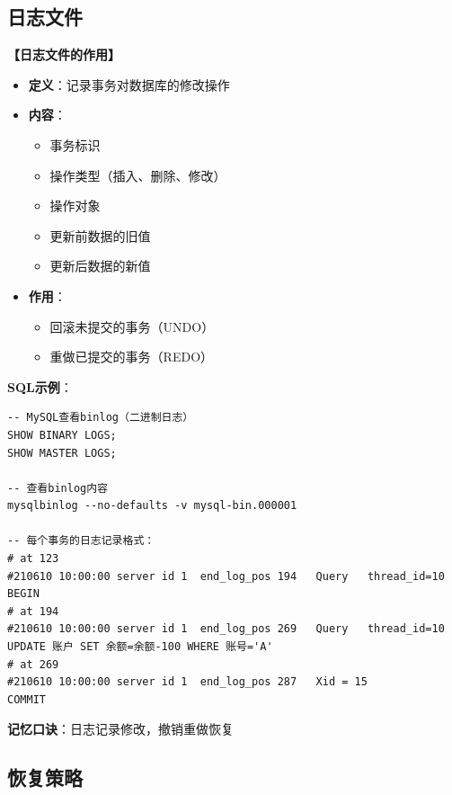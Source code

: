 \documentclass[12pt, a4paper]{article}
\newenvironment{bluebox}[1]{%
  \begin{trivlist}
  \item[\hskip\labelsep \textbf{#1}]
  \setlength{\parskip}{0.5ex}
  \setlength{\itemsep}{0.5ex}
}{%
  \end{trivlist}
  }
\begin{document}
\subsection{日志文件}

\begin{bluebox}{日志文件}
	\textbf{【日志文件的作用】}

	\begin{itemize}[leftmargin=*, nosep]
		\item \textbf{定义}：记录事务对数据库的修改操作
		\item \textbf{内容}：
		      \begin{itemize}[nosep]
			      \item 事务标识
			      \item 操作类型（插入、删除、修改）
			      \item 操作对象
			      \item 更新前数据的旧值
			      \item 更新后数据的新值
		      \end{itemize}
		\item \textbf{作用}：
		      \begin{itemize}[nosep]
			      \item 回滚未提交的事务（UNDO）
			      \item 重做已提交的事务（REDO）
		      \end{itemize}
	\end{itemize}

	\textbf{SQL示例}：
	\begin{verbatim}
-- MySQL查看binlog（二进制日志）
SHOW BINARY LOGS;
SHOW MASTER LOGS;

-- 查看binlog内容
mysqlbinlog --no-defaults -v mysql-bin.000001

-- 每个事务的日志记录格式：
# at 123
#210610 10:00:00 server id 1  end_log_pos 194   Query   thread_id=10
BEGIN
# at 194
#210610 10:00:00 server id 1  end_log_pos 269   Query   thread_id=10
UPDATE 账户 SET 余额=余额-100 WHERE 账号='A'
# at 269
#210610 10:00:00 server id 1  end_log_pos 287   Xid = 15
COMMIT
	\end{verbatim}

	\textbf{记忆口诀}：日志记录修改，撤销重做恢复
\end{bluebox}

\subsection{恢复策略}
\end{document}
